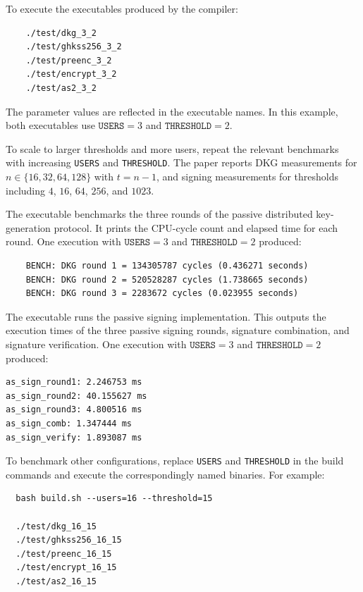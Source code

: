 \documentclass[nonacm,sigconf]{acmart}
\begin{document}
\begin{compactitem}
\begin{asparadesc}
  To execute the executables produced by the compiler:

  \begin{verbatim}
    ./test/dkg_3_2
    ./test/ghkss256_3_2
    ./test/preenc_3_2
    ./test/encrypt_3_2
    ./test/as2_3_2
  \end{verbatim}

  The parameter values are reflected in the executable names. In this example, both executables use $\texttt{USERS}=3$ and $\texttt{THRESHOLD}=2$.

  To scale to larger thresholds and more users, repeat the relevant benchmarks with increasing \texttt{USERS} and \texttt{THRESHOLD}. The paper reports DKG measurements for $n\in\{16,32,64,128\}$ with $t=n-1$, and signing measurements for thresholds including $4$, $16$, $64$, $256$, and $1023$.

  \item[Results:] The executable  benchmarks the three rounds of the passive distributed key-generation protocol. It prints the CPU-cycle count and elapsed time for each round. One execution with $\texttt{USERS}=3$ and $\texttt{THRESHOLD}=2$ produced:

  \begin{verbatim}
    BENCH: DKG round 1 = 134305787 cycles (0.436271 seconds)
    BENCH: DKG round 2 = 520528287 cycles (1.738665 seconds)
    BENCH: DKG round 3 = 2283672 cycles (0.023955 seconds)
  \end{verbatim}

  The executable  runs the passive signing implementation. This outputs the execution times of the three passive signing rounds, signature combination, and signature verification. One execution with $\texttt{USERS}=3$ and $\texttt{THRESHOLD}=2$ produced:

  \begin{verbatim}
as_sign_round1: 2.246753 ms
as_sign_round2: 40.155627 ms
as_sign_round3: 4.800516 ms
as_sign_comb: 1.347444 ms
as_sign_verify: 1.893087 ms
  \end{verbatim}

To benchmark other configurations, replace \texttt{USERS} and \texttt{THRESHOLD} in the build commands and execute the correspondingly named binaries. For example:

\begin{verbatim}
  bash build.sh --users=16 --threshold=15

  ./test/dkg_16_15
  ./test/ghkss256_16_15
  ./test/preenc_16_15
  ./test/encrypt_16_15
  ./test/as2_16_15
\end{verbatim}


\end{asparadesc}
\end{compactitem}
\end{document}

